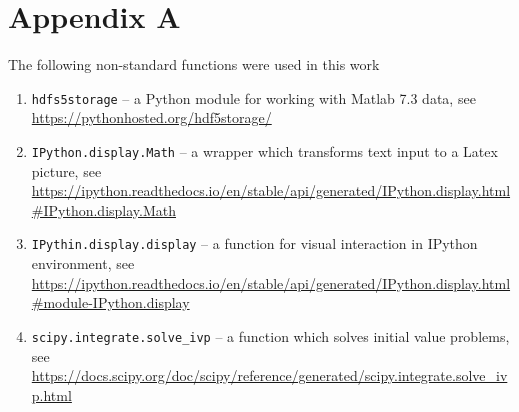 \documentclass{article}
\begin{document}
\section{Appendix A}
The following non-standard functions were used in this work
\begin{enumerate}
    \item \texttt{hdfs5storage} -- a Python module for working with Matlab 7.3 data, see \url{https://pythonhosted.org/hdf5storage/}
    \item \texttt{IPython.display.Math} -- a wrapper which transforms text input to a Latex picture, see \url{https://ipython.readthedocs.io/en/stable/api/generated/IPython.display.html#IPython.display.Math}
    \item \texttt{IPythin.display.display} -- a function for visual interaction in IPython environment, see \url{https://ipython.readthedocs.io/en/stable/api/generated/IPython.display.html#module-IPython.display}
    \item \texttt{scipy.integrate.solve\_ivp} -- a function which solves initial value problems, see \url{https://docs.scipy.org/doc/scipy/reference/generated/scipy.integrate.solve_ivp.html}
\end{enumerate}
\end{document}
